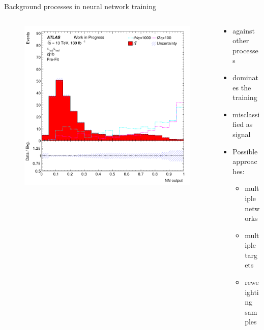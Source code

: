 \begin{frame}{Background processes in neural network training}
    \begin{columns}
        \begin{column}{0.5\textwidth}
            \begin{figure}
                \centering
                \includegraphics[width=\textwidth]{sgBkgComp}
            \end{figure}
        \end{column}
        \begin{column}{0.5\textwidth}
            \begin{itemize}
                \item \tHq against other processes
                \vspace{0.5cm}
                \item \ttbar dominates the training
                \vspace{0.5cm}
                \item \tZq misclassified as signal
                \vspace{0.5cm}
                \item Possible approaches:
                    \begin{itemize}
                        \item multiple networks
                        \item multiple targets
                        \item reweighting samples
                    \end{itemize} 
            \end{itemize}
        \end{column}
    \end{columns}
\end{frame}